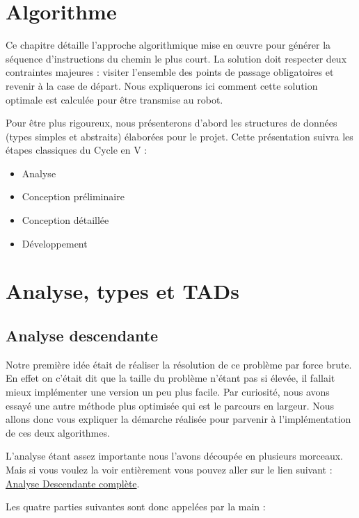 \section{Algorithme}
Ce chapitre détaille l'approche algorithmique mise en œuvre pour générer la séquence d'instructions du chemin le plus court. La solution doit respecter deux contraintes majeures : visiter l'ensemble des points de passage obligatoires et revenir à la case de départ. Nous expliquerons ici comment cette solution optimale est calculée pour être transmise au robot.

Pour être plus rigoureux, nous présenterons d'abord les structures de données (types simples et abstraits) élaborées pour le projet. Cette présentation suivra les étapes classiques du Cycle en V :
\begin{itemize}
\item Analyse
\item Conception préliminaire
\item Conception détaillée
\item Développement
\end{itemize}

\section{Analyse, types et TADs}

\subsection{Analyse descendante}

Notre première idée était de réaliser la résolution de ce problème par force brute. En effet on c'était dit que la taille du problème n'étant pas si élevée, il fallait mieux implémenter une version un peu plus facile. Par curiosité, nous avons essayé une autre méthode plus optimisée qui est le parcours en largeur. Nous allons donc vous expliquer la démarche réalisée pour parvenir à l'implémentation de ces deux algorithmes.

L'analyse étant assez importante nous l'avons découpée en plusieurs morceaux. Mais si vous voulez la voir entièrement vous pouvez aller sur le lien suivant :
\href{https://www.canva.com/design/DAG62an317c/3s4-ixAc3roh58rsiQIZfg/edit?utm_content=DAG62an317c&utm_campaign=designshare&utm_medium=link2&utm_source=sharebutton}{Analyse Descendante complète}.

Les quatre parties suivantes sont donc appelées par la main :

